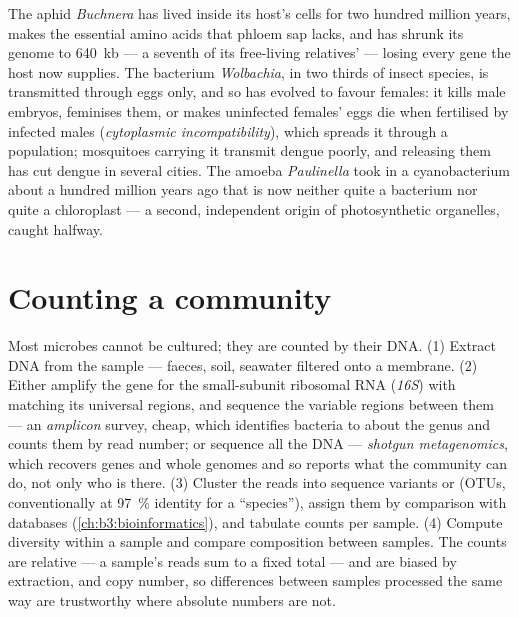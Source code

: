 \begin{example}\label{ex:b3:microbiomes:obligate}
The aphid \emph{Buchnera} has lived inside its host's cells for two
hundred million years, makes the essential amino acids that phloem sap
lacks, and has shrunk its genome to \qty{640}{kb} --- a seventh of its
free-living relatives' --- losing every gene the host now supplies. The
bacterium \emph{Wolbachia}, in two thirds of insect species, is
transmitted through eggs only, and so has evolved to favour females: it
kills male embryos, feminises them, or makes uninfected females' eggs
die when fertilised by infected males (\emph{cytoplasmic
incompatibility}), which spreads it through a population; mosquitoes
carrying it transmit dengue poorly, and releasing them has cut dengue
in several cities. The amoeba \emph{Paulinella} took in a
cyanobacterium about a hundred million years ago that is now neither
quite a bacterium nor quite a chloroplast --- a second, independent
origin of photosynthetic organelles, caught halfway.
\end{example}

\section{Counting a community}

\begin{method}\label{met:b3:microbiomes:16s}
Most microbes cannot be cultured; they are counted by their DNA. (1)
Extract DNA from the sample --- faeces, soil, seawater filtered onto a
membrane. (2) Either amplify the gene for the small-subunit ribosomal
RNA (\emph{16S}) with  matching its universal regions, and
sequence the variable regions between them --- an \emph{amplicon}
survey, cheap, which identifies bacteria to about the genus and counts
them by read number; or sequence all the DNA --- \emph{shotgun
metagenomics}, which recovers genes and whole genomes and so reports
what the community can do, not only who is there. (3) Cluster the reads
into sequence variants or \emph{} (OTUs,
conventionally at \qty{97}{\%} identity for a ``species''), assign them
by comparison with databases (\cref{ch:b3:bioinformatics}), and
tabulate counts per sample. (4) Compute diversity within a sample and
compare composition between samples. The counts are relative --- a
sample's reads sum to a fixed total --- and are biased by extraction,
 and copy number, so differences between samples processed the
same way are trustworthy where absolute numbers are not.
\end{method}

